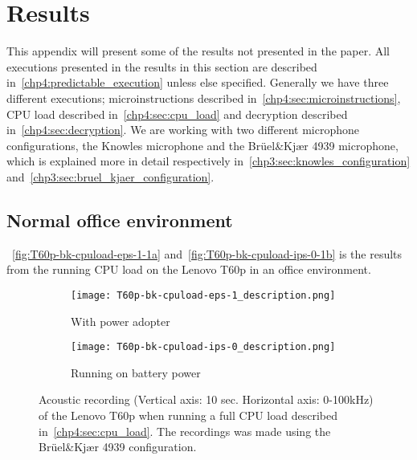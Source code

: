 \chapter{Results}\label{apx:results}
This appendix will present some of the results not presented in the paper.
All executions presented in the results in this section are described in~\autoref{chp4:predictable_execution} unless else specified. 
Generally we have three different executions; microinstructions described in~\autoref{chp4:sec:microinstructions}, CPU load described in~\autoref{chp4:sec:cpu_load} and decryption described in~\autoref{chp4:sec:decryption}. 
We are working with two different microphone configurations, the Knowles microphone and the Brüel\&Kjær 4939 microphone, which is explained more in detail respectively in~\autoref{chp3:sec:knowles_configuration} and~\autoref{chp3:sec:bruel_kjaer_configuration}.

\section{Normal office environment}

~\autoref{fig:T60p-bk-cpuload-eps-1-1a} and~\autoref{fig:T60p-bk-cpuload-ips-0-1b} is the results from the running CPU load on the Lenovo T60p in an office environment. 
\begin{figure}[ht]
	\begin{subfigure}{0.5\textwidth}
	    \centering
	    \texttt{[image: T60p-bk-cpuload-eps-1\_description.png]}
	    \caption{With power adopter}
	    \label{fig:T60p-bk-cpuload-eps-1-1a}
    \end{subfigure}
    \begin{subfigure}{0.5\textwidth}
	    \centering
	    \texttt{[image: T60p-bk-cpuload-ips-0\_description.png]}
	    \caption{Running on battery power}
	    \label{fig:T60p-bk-cpuload-ips-0-1b}
    \end{subfigure}
    \caption{Acoustic recording (Vertical axis: 10 sec. Horizontal axis: 0-100kHz) of the Lenovo T60p when running a full CPU load described in~\autoref{chp4:sec:cpu_load}. The recordings was made using the Brüel\&Kjær 4939 configuration. }
	\label{fig:T60p-bk-cpuload}
\end{figure}

